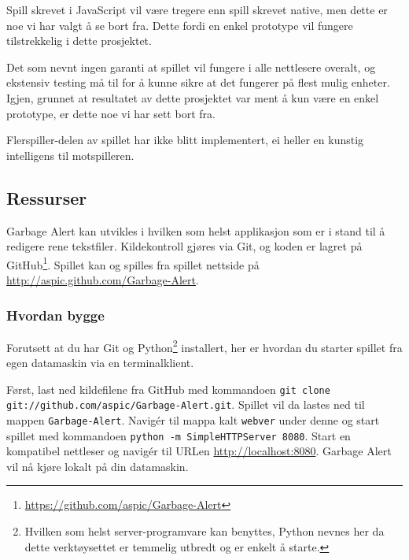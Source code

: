 Spill skrevet i JavaScript vil være tregere enn spill skrevet native, men dette er noe vi har valgt å se bort fra. Dette fordi en enkel prototype vil fungere tilstrekkelig i dette prosjektet.

Det som nevnt ingen garanti at spillet vil fungere i alle nettlesere overalt, og ekstensiv testing må til for å kunne sikre at det fungerer på flest mulig enheter. Igjen, grunnet at resultatet av dette prosjektet var ment å kun være en enkel prototype, er dette noe vi har sett bort fra.

Flerspiller-delen av spillet har ikke blitt implementert, ei heller en kunstig intelligens til motspilleren.


\subsection{Ressurser}
Garbage Alert kan utvikles i hvilken som helst applikasjon som er i stand til å redigere rene tekstfiler. Kildekontroll gjøres via Git, og koden er lagret på GitHub\footnote{\url{https://github.com/aspic/Garbage-Alert}}. Spillet kan og spilles fra spillet nettside på \url{http://aspic.github.com/Garbage-Alert}.

\subsubsection*{Hvordan bygge}
Forutsett at du har Git og Python\footnote{Hvilken som helst server-programvare kan benyttes, Python nevnes her da dette verktøysettet er temmelig utbredt og er enkelt å starte.} installert, her er hvordan du starter spillet fra egen datamaskin via en terminalklient.

Først, last ned kildefilene fra GitHub med kommandoen \newline\texttt{git clone git://github.com/aspic/Garbage-Alert.git}. Spillet vil da lastes ned til mappen \texttt{Garbage-Alert}. Navigér til mappa kalt \texttt{webver} under denne  og start spillet med kommandoen \texttt{python -m SimpleHTTPServer 8080}. Start en kompatibel nettleser og navigér til URLen \url{http://localhost:8080}. Garbage Alert vil nå kjøre lokalt på din datamaskin.
